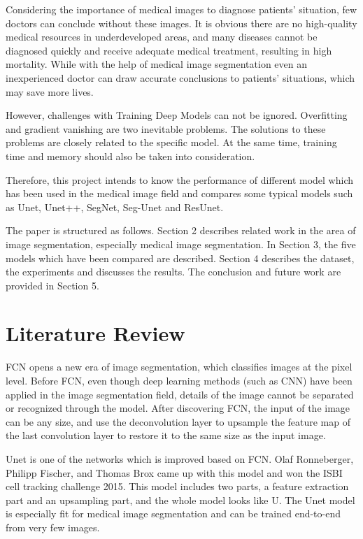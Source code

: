 \documentclass{article}
\begin{document}
Considering the importance of medical images to diagnose patients' situation, few doctors can conclude without these images.
It is obvious there are no high-quality medical resources in underdeveloped areas, and many diseases cannot be diagnosed quickly and receive adequate medical treatment, resulting in high mortality.
While with the help of medical image segmentation even an inexperienced doctor can draw accurate conclusions to patients' situations, which may save more lives.\cite{jin2019dunet}

However, challenges with Training Deep Models can not be ignored.
Overfitting and gradient vanishing are two inevitable problems.
The solutions to these problems are closely related to the specific model.
At the same time, training time and memory should also be taken into consideration.

Therefore, this project intends to know the performance of different model which has been used in the medical image field and compares some typical models such as Unet, Unet++, SegNet, Seg-Unet and ResUnet.

The paper is structured as follows.
Section 2 describes related work in the area of image segmentation, especially medical image segmentation.
In Section 3, the five models which have been compared are described.
Section 4 describes the dataset, the experiments and discusses the results.
The conclusion and future work are provided in Section 5.


\section{Literature Review}
FCN opens a new era of image segmentation, which classifies images at the pixel level.
Before FCN, even though deep learning methods (such as CNN) have been applied in the image segmentation field, details of the image cannot be separated or recognized through the model.
After discovering FCN, the input of the image can be any size, and use the deconvolution layer to upsample the feature map of the last convolution layer to restore it to the same size as the input image. \cite{Long_2015_CVPR}

Unet is one of the networks which is improved based on FCN.
Olaf Ronneberger, Philipp Fischer, and Thomas Brox came up with this model and won the ISBI cell tracking challenge 2015.
This model includes two parts, a feature extraction part and an upsampling part, and the whole model looks like U.
The Unet model is especially fit for medical image segmentation and can be trained end-to-end from very few images.\cite{DBLP:journals/corr/RonnebergerFB15}
\end{document}
